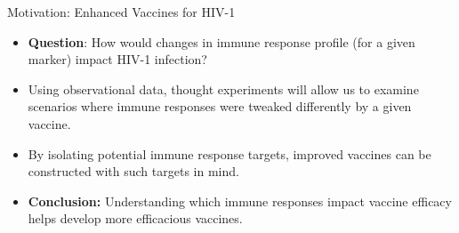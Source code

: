 \documentclass{beamer}
\begin{document}
\begin{frame}[c]{Motivation: Enhanced Vaccines for HIV-1}

\begin{center}
\begin{itemize}
  \itemsep10pt
  \item \textbf{Question}: How would changes in immune response profile (for a
    given marker) impact HIV-1 infection?
  \item Using observational data, thought experiments will allow us to examine
    scenarios where immune responses were tweaked differently by a given
    vaccine.
  \item By isolating potential immune response targets, improved vaccines can be
    constructed with such targets in mind.
  \item \textbf{Conclusion:} Understanding which immune responses impact vaccine
    efficacy helps develop more efficacious vaccines.
\end{itemize}
\end{center}


\end{frame}

\end{document}
